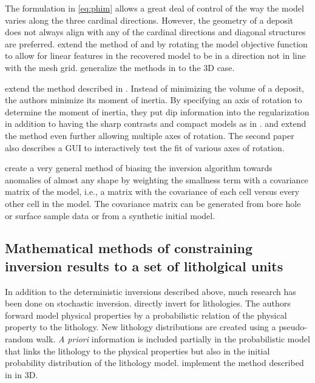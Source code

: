 The formulation in \autoref{eq:phim} allows a great deal of control of the way the model varies along the three cardinal directions. However, the geometry of a deposit does not always align with any of the cardinal directions and diagonal structures are preferred. \cite{li2000incorporating}  extend the method of \cite{li19963} and \cite{li19983} by rotating the model objective function to allow for linear features in the recovered model to be in a direction not in line with the mesh grid. \cite{lelievre2009comprehensive} generalize the methods in \cite{li2000incorporating} to the 3D case.

\cite{guillen1984gravity} extend the method described in \cite{last1983compact}. Instead of minimizing the volume of a deposit, the authors minimize its moment of inertia. By specifying an axis of rotation to determine the moment of inertia, they put dip information into the regularization in addition to having the sharp contrasts and compact models as in \cite{last1983compact}.  \cite{barbosa1994generalized} and \cite{barbosa2006interactive} extend the method even further allowing multiple axes of rotation. The second paper also describes a GUI to interactively test the fit of various axes of rotation.

\cite{chasseriau20033d} create a very general method of biasing the inversion algorithm towards anomalies of almost any shape by weighting the smallness term with a covariance matrix of the model, i.e., a matrix with the covariance of each cell versus every other cell in the model. The covariance matrix can be generated from bore hole or surface sample data or from a synthetic initial model.

\subsection{Mathematical methods of constraining inversion results to a set of litholgical units}
\label{subsec:litrevLitho}

In addition to the deterministic inversions described above, much research has been done on stochastic inversion. \cite{bosch2001lithologic} directly invert for lithologies. The authors forward model physical properties by a probabilistic relation of the physical property to the lithology. New lithology distributions are created using a pseudo-random walk. \emph{A priori} information is included partially in the probabilistic model that links the lithology to the physical properties but also in the initial probability distribution of the lithology model. \cite{guillen2008geological} implement the method described in \cite{bosch2001lithologic} in 3D. 


